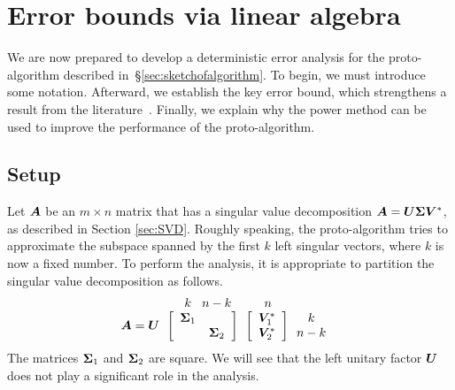 \documentclass[final]{siamltex}
\newcounter{algorithm}[section]
\begin{document}
\section{Error bounds via linear algebra}
\label{sec:basic_err}

We are now prepared to develop a deterministic error analysis for the proto-algorithm
described in~\S\ref{sec:sketchofalgorithm}.
To begin, we must introduce some notation.  Afterward, we establish the key
error bound, which strengthens a result from the literature~\cite[Lem.~4.2]{BMD09:Improved-Approximation}.
Finally, we explain why the power method can be used to improve the
performance of the proto-algorithm.

\subsection{Setup}

Let $\bm{A}$ be an $m \times n$ matrix that has a singular value
decomposition $\bm{A} = \bm{U\Sigma V}^{*}$, as described
in Section \ref{sec:SVD}.
Roughly speaking, the proto-algorithm tries to approximate
the subspace spanned by the first $k$ left singular vectors,
where $k$ is now a fixed number.  To perform the analysis,
it is appropriate to partition the singular value decomposition
as follows.
\begin{equation}
\label{eq:mugpart}
\begin{array}{@{}c@{}r@{}c@{}c@{}c@{}c@{}c}
        && k & n - k && n & \\
    \mtx{A} = \mtx{U} &\left. \begin{array}{c} \\ \\ \end{array} \!\!\! \right[ &
    \begin{array}{c} \mtx{\Sigma}_1 \\ \phantom{\mtx{\Sigma}_2} \end{array} &
    \begin{array}{c} \phantom{\mtx{\Sigma}_1} \\ \mtx{\Sigma}_2 \end{array} &
    \left] \!\!\! \begin{array}{c} \\ \\ \end{array} \right. &
    \left[\begin{array}{c} \mtx{V}_{1}^{\adj} \\ \mtx{V}_{2}^{\adj}\end{array}\right]\,
    & \begin{array}{c} k \\ n - k \\ \end{array}
\end{array}
\end{equation}
The matrices $\bm{\Sigma}_1$ and $\bm{\Sigma}_2$ are square.
We will see that the left unitary factor $\bm{U}$ does not play
a significant role in the analysis.
\end{document}
